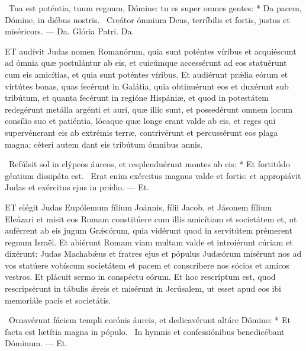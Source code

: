 \R\ Tua est poténtia, tuum regnum, Dómine: tu es super omnes gentes: * Da pacem, Dómine, in diébus nostris. \V\ Creátor ómnium Deus, terríbilis et fortis, justus et miséricors. — Da. Glória Patri. Da.




\lettrine[lines=2]{E}{T} audívit Judas nomen Romanórum, quia sunt poténtes víribus et acquiéscunt ad ómnia quæ postulántur ab eis, et cuicúmque accessérunt ad eos statuérunt cum eis amicítias, et quia sunt poténtes víribus. Et audiérunt prǽlia eórum et virtútes bonas, quas fecérunt in Galátia, quia obtinuérunt eos et duxérunt sub tribútum, et quanta fecérunt in regióne Hispániæ, et quod in potestátem redegérunt metálla argénti et auri, quæ illic sunt, et possedérunt omnem locum consílio suo et patiéntia, lócaque quæ longe erant valde ab eis, et reges qui supervénerant eis ab extrémis terræ, contrivérunt et percussérunt eos plaga magna; céteri autem dant eis tribútum ómnibus annis.

\R\ Refúlsit sol in clýpeos áureos, et resplenduérunt montes ab eis: * Et fortitúdo géntium dissipáta est. \V\ Erat enim exércitus magnus valde et fortis: et appropiávit Judas et exércitus ejus in prǽlio. — Et.


\lettrine[lines=2]{E}{T} elégit Judas Eupólemum fílium Joánnis, fílii Jacob, et Jásonem fílium Eleázari et misit eos Romam constitúere cum illis amicítiam et societátem et, ut auférrent ab eis jugum Grǽcórum, quia vidérunt quod in servitútem prémerent regnum Israël. Et abiérunt Romam viam multam valde et introiérunt cúriam et dixérunt: Judas Machabǽus et fratres ejus et pópulus Judæórum misérunt nos ad vos statúere vobíscum societátem et pacem et conscríbere nos sócios et amícos vestros. Et plácuit sermo in conspéctu eórum. Et hoc rescríptum est, quod rescripsérunt in tábulis ǽreis et misérunt in Jerúsalem, ut esset apud eos ibi memoriále pacis et societátis.

\R\ Ornavérunt fáciem templi corónis áureis, et dedicavérunt altáre Dómino: * Et facta est lætítia magna in pópulo. \V\ In hymnis et confessiónibus benedicébant Dóminum. — Et.


